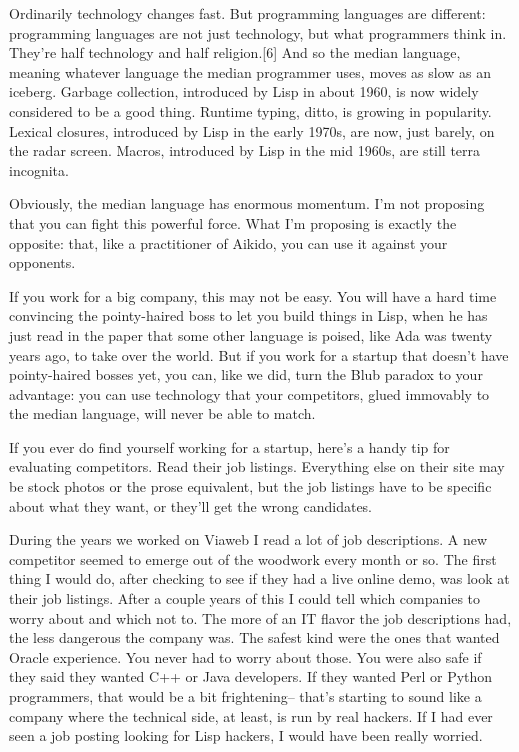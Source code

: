 Ordinarily technology changes fast. But programming languages are
different: programming languages are not just technology, but what
programmers think in. They're half technology and half religion.{[}6{]}
And so the median language, meaning whatever language the median
programmer uses, moves as slow as an iceberg. Garbage collection,
introduced by Lisp in about 1960, is now widely considered to be a good
thing. Runtime typing, ditto, is growing in popularity. Lexical
closures, introduced by Lisp in the early 1970s, are now, just barely,
on the radar screen. Macros, introduced by Lisp in the mid 1960s, are
still terra incognita.

Obviously, the median language has enormous momentum. I'm not proposing
that you can fight this powerful force. What I'm proposing is exactly
the opposite: that, like a practitioner of Aikido, you can use it
against your opponents.

If you work for a big company, this may not be easy. You will have a
hard time convincing the pointy-haired boss to let you build things in
Lisp, when he has just read in the paper that some other language is
poised, like Ada was twenty years ago, to take over the world. But if
you work for a startup that doesn't have pointy-haired bosses yet, you
can, like we did, turn the Blub paradox to your advantage: you can use
technology that your competitors, glued immovably to the median
language, will never be able to match.

If you ever do find yourself working for a startup, here's a handy tip
for evaluating competitors. Read their job listings. Everything else on
their site may be stock photos or the prose equivalent, but the job
listings have to be specific about what they want, or they'll get the
wrong candidates.

During the years we worked on Viaweb I read a lot of job descriptions. A
new competitor seemed to emerge out of the woodwork every month or so.
The first thing I would do, after checking to see if they had a live
online demo, was look at their job listings. After a couple years of
this I could tell which companies to worry about and which not to. The
more of an IT flavor the job descriptions had, the less dangerous the
company was. The safest kind were the ones that wanted Oracle
experience. You never had to worry about those. You were also safe if
they said they wanted C++ or Java developers. If they wanted Perl or
Python programmers, that would be a bit frightening-- that's starting to
sound like a company where the technical side, at least, is run by real
hackers. If I had ever seen a job posting looking for Lisp hackers, I
would have been really worried.

